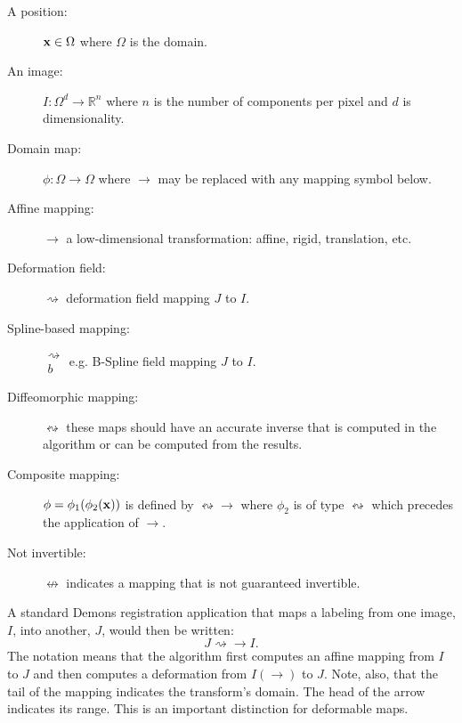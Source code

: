 \documentclass{article}
\begin{document}
\begin{description}
\item [A position:] ${\bf x} \in \Omega$ where $\Omega$ is the domain. 
\item [An image:]  $ I \colon \Omega^d \to \mathbb{R}^n$ where $n$ is the
  number of components per pixel and $d$ is dimensionality.
\item [Domain map:] $ \phi \colon \Omega  \to \Omega $ where $\to$ may be
  replaced with any mapping symbol below. 
\item [Affine mapping:] $\rightarrow$ a low-dimensional
  transformation: affine, rigid, translation, etc. 
\item [Deformation field:] $ \rightsquigarrow$ deformation field mapping $J$
  to $I$.
\item [Spline-based mapping:] $\substack{
   \rightsquigarrow \\
   b
  }$ e.g. B-Spline field mapping $J$
  to $I$.
\item [Diffeomorphic mapping:] $ \leftrightsquigarrow$ these maps
  should have an accurate inverse that is computed in the algorithm or can be computed from the results.
\item [Composite mapping:] $\phi=\phi_1(\phi_2({\bf x}))$ is defined by $\leftrightsquigarrow
  \rightarrow$ where $\phi_2$ is of type $\leftrightsquigarrow$ which precedes the application of $\rightarrow$.
\item[Not invertible:]  $\nleftrightarrow$ indicates a mapping that is
  not guaranteed invertible.
\end{description}
A standard Demons registration application that maps a labeling from
one image, $I$, into another, $J$, would then be written:
$$
J \rightsquigarrow \rightarrow  I .
$$
The notation means that the algorithm first computes an affine mapping
from $I$ to $J$ and then computes a deformation from $I( \rightarrow )$
to $J$.  Note, also, that the tail of the mapping indicates the
transform's domain.  The head of the arrow indicates its range.  This
is an important distinction for deformable maps. 
\end{document}
